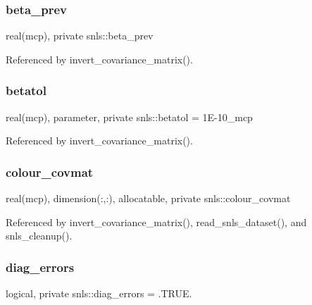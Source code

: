 \subsubsection{\texorpdfstring{beta\+\_\+prev}{beta\_prev}}
{\footnotesize\ttfamily real(mcp), private snls\+::beta\+\_\+prev\hspace{0.3cm}{\ttfamily [private]}}



Referenced by invert\+\_\+covariance\+\_\+matrix().

\mbox{\label{namespacesnls_a2e0b3cead11bfcbc6a35da642d41c977}} 
\subsubsection{\texorpdfstring{betatol}{betatol}}
{\footnotesize\ttfamily real(mcp), parameter, private snls\+::betatol = 1\+E-\/10\+\_\+mcp\hspace{0.3cm}{\ttfamily [private]}}



Referenced by invert\+\_\+covariance\+\_\+matrix().

\mbox{\label{namespacesnls_afed063275d19022044504128d8238e76}} 
\subsubsection{\texorpdfstring{colour\+\_\+covmat}{colour\_covmat}}
{\footnotesize\ttfamily real(mcp), dimension(\+:,\+:), allocatable, private snls\+::colour\+\_\+covmat\hspace{0.3cm}{\ttfamily [private]}}



Referenced by invert\+\_\+covariance\+\_\+matrix(), read\+\_\+snls\+\_\+dataset(), and snls\+\_\+cleanup().

\mbox{\label{namespacesnls_ae0c3dc7f2e96ed1de4ff8dfcc81195e9}} 
\subsubsection{\texorpdfstring{diag\+\_\+errors}{diag\_errors}}
{\footnotesize\ttfamily logical, private snls\+::diag\+\_\+errors = .T\+R\+U\+E.\hspace{0.3cm}{\ttfamily [private]}}



